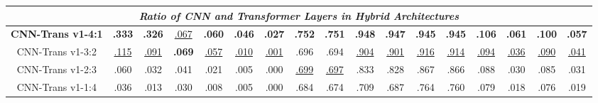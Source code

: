 \begin{table}[t]
{\begin{tabular}{@{} p{0.9cm} p{0.55cm} p{0.55cm} p{0.55cm} p{0.55cm} p{0.55cm} p{0.55cm} p{0.55cm} p{0.55cm} p{0.55cm} p{0.55cm} p{0.55cm} p{0.55cm} p{0.55cm} p{0.52cm} p{0.52cm} p{0.52cm} p{0.52cm} @{}}
\multicolumn{18}{c}{\textbf{\textit{Ratio of CNN and Transformer Layers in Hybrid Architectures}}} \\ 
\midrule  
\multicolumn{2}{c}{\textbf{CNN-Trans v1-4:1}} 
  & \multicolumn{1}{c}{{\textbf{.333}}} 
  & \multicolumn{1}{c}{{\textbf{.326}}} 
  & \multicolumn{1}{c}{{\underline{.067}}}
  & \multicolumn{1}{c}{{\textbf{.060}}} 
  & \multicolumn{1}{c}{{\textbf{.046}}} 
  & \multicolumn{1}{c}{{\textbf{.027}} }
  & \multicolumn{1}{c}{{\textbf{.752}} }
  & \multicolumn{1}{c}{{\textbf{.751}} }
  & \multicolumn{1}{c}{{\textbf{.948}} }
  & \multicolumn{1}{c}{{\textbf{.947}} }
  & \multicolumn{1}{c}{{\textbf{.945}} }
  & \multicolumn{1}{c}{{\textbf{.945}} }
  & \multicolumn{1}{c}{{\textbf{.106}} }
  & \multicolumn{1}{c}{{\textbf{.061}} }
  & \multicolumn{1}{c}{{\textbf{.100}} }
  & \multicolumn{1}{c}{{\textbf{.057}}} \\ 
\multicolumn{2}{c}{CNN-Trans v1-3:2} 
  & \multicolumn{1}{c}{{\underline{.115}}} 
  & \multicolumn{1}{c}{{\underline{.091}}} 
  & \multicolumn{1}{c}{{\textbf{.069}}} 
  & \multicolumn{1}{c}{{\underline{.057}}} 
  & \multicolumn{1}{c}{{\underline{.010}}} 
  & \multicolumn{1}{c}{{\underline{.001}}} 
  & \multicolumn{1}{c}{.696} 
  & \multicolumn{1}{c}{.694} 
  & \multicolumn{1}{c}{{\underline{.904}}} 
  & \multicolumn{1}{c}{{\underline{.901}}} 
  & \multicolumn{1}{c}{{\underline{.916}}}
  & \multicolumn{1}{c}{{\underline{.914}}}
  & \multicolumn{1}{c}{{\underline{.094}}}
  & \multicolumn{1}{c}{{\underline{.036}}}
  & \multicolumn{1}{c}{{\underline{.090}}}
  & \multicolumn{1}{c}{{\underline{.041}}} \\ 
\multicolumn{2}{c}{CNN-Trans v1-2:3} 
  & \multicolumn{1}{c}{.060} 
  & \multicolumn{1}{c}{.032} 
  & \multicolumn{1}{c}{.041} 
  & \multicolumn{1}{c}{.021} 
  & \multicolumn{1}{c}{.005} 
  & \multicolumn{1}{c}{.000} 
  & \multicolumn{1}{c}{{\underline{.699}}} 
  & \multicolumn{1}{c}{{\underline{.697}}} 
  & \multicolumn{1}{c}{.833} 
  & \multicolumn{1}{c}{.828} 
  & \multicolumn{1}{c}{.867} 
  & \multicolumn{1}{c}{.866} 
  & \multicolumn{1}{c}{.088} 
  & \multicolumn{1}{c}{.030} 
  & \multicolumn{1}{c}{.085} 
  & \multicolumn{1}{c}{.031} \\ 
\multicolumn{2}{c}{CNN-Trans v1-1:4} 
  & \multicolumn{1}{c}{.036} 
  & \multicolumn{1}{c}{.013} 
  & \multicolumn{1}{c}{.030} 
  & \multicolumn{1}{c}{.008} 
  & \multicolumn{1}{c}{.005} 
  & \multicolumn{1}{c}{.000} 
  & \multicolumn{1}{c}{.684} 
  & \multicolumn{1}{c}{.674} 
  & \multicolumn{1}{c}{.709} 
  & \multicolumn{1}{c}{.687} 
  & \multicolumn{1}{c}{.764} 
  & \multicolumn{1}{c}{.760} 
  & \multicolumn{1}{c}{.079} 
  & \multicolumn{1}{c}{.018} 
  & \multicolumn{1}{c}{.076} 
  & \multicolumn{1}{c}{.019} \\ 
\midrule


\end{tabular}}
\end{table}
